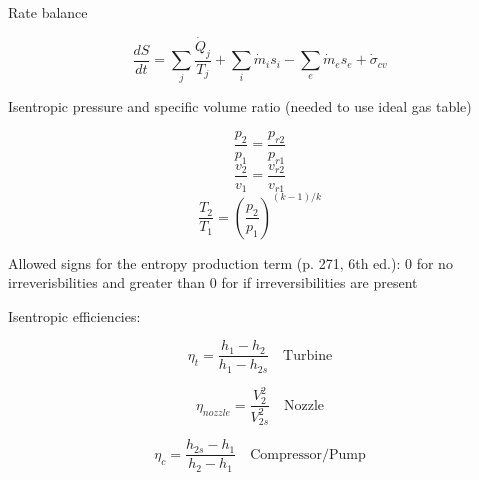 \documentclass[paper=letter, fontsize=11pt]{scrartcl}
\numberwithin{equation}{section}        %
\numberwithin{figure}{section}          %
\numberwithin{table}{section}               %
\begin{document}
Rate balance

\begin{equation}
    \frac{dS}{dt} = \sum_j \frac{\dot Q_j}{T_j} + \sum_i \dot m_i s_i - \sum_e \dot m_e s_e +\dot\sigma_{cv}
\end{equation}

Isentropic pressure and specific volume ratio (needed to use ideal gas table)

\begin{equation}
    \frac{p_2}{p_1}=\frac{p_{r2}}{p_{r1}}
\end{equation}
\begin{equation}
    \frac{v_2}{v_1}=\frac{v_{r2}}{v_{r1}}
\end{equation}
\begin{equation}
    \frac{T_2}{T_1} = \left(\frac{p_2}{p_1}\right)^{(k-1)/k}
\end{equation}

Allowed signs for the entropy production term (p. 271, 6th ed.): 0 for no irreverisbilities and greater than 0 for if irreversibilities are present

Isentropic efficiencies:

\begin{equation}
    \eta_t = \frac{h_1 - h_2}{h_1 - h_{2s}}\quad\text{Turbine}
\end{equation}

\begin{equation}
    \eta_{nozzle} = \frac{V_2^2}{V_{2s}^2}\quad\text{Nozzle}
\end{equation}

\begin{equation}
    \eta_c = \frac{h_{2s} - h_1}{h_2 - h_1}\quad\text{Compressor/Pump}
\end{equation}



\end{document}

